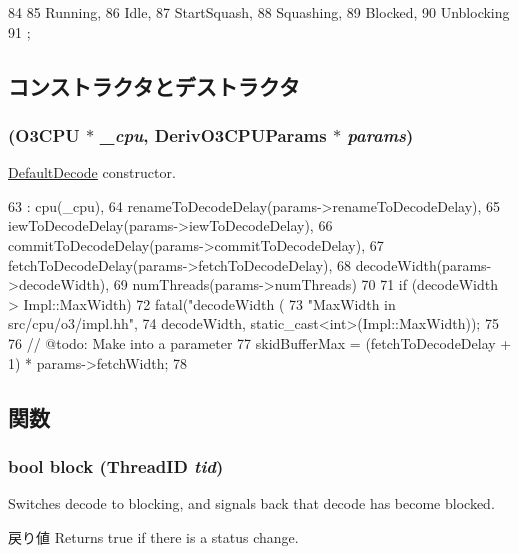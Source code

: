 \begin{DoxyCode}
84                       {
85         Running,
86         Idle,
87         StartSquash,
88         Squashing,
89         Blocked,
90         Unblocking
91     };
\end{DoxyCode}


\subsection{コンストラクタとデストラクタ}
\hypertarget{classDefaultDecode_a23f15d8a826761fea1106a071b97cf79}{
\subsubsection[{DefaultDecode}]{ ({\bf O3CPU} $\ast$ {\em \_\-cpu}, \/  DerivO3CPUParams $\ast$ {\em params})}}
\label{classDefaultDecode_a23f15d8a826761fea1106a071b97cf79}
\hyperlink{classDefaultDecode}{DefaultDecode} constructor. 


\begin{DoxyCode}
63     : cpu(_cpu),
64       renameToDecodeDelay(params->renameToDecodeDelay),
65       iewToDecodeDelay(params->iewToDecodeDelay),
66       commitToDecodeDelay(params->commitToDecodeDelay),
67       fetchToDecodeDelay(params->fetchToDecodeDelay),
68       decodeWidth(params->decodeWidth),
69       numThreads(params->numThreads)
70 {
71     if (decodeWidth > Impl::MaxWidth)
72         fatal("decodeWidth (%
73              "\tincrease MaxWidth in src/cpu/o3/impl.hh\n",
74              decodeWidth, static_cast<int>(Impl::MaxWidth));
75 
76     // @todo: Make into a parameter
77     skidBufferMax = (fetchToDecodeDelay + 1) *  params->fetchWidth;
78 }
\end{DoxyCode}


\subsection{関数}
\hypertarget{classDefaultDecode_ad1993925abd15d3fb59fde2ccfa3d678}{
\subsubsection[{block}]{\setlength{\rightskip}{0pt plus 5cm}bool block ({\bf ThreadID} {\em tid})}}
\label{classDefaultDecode_ad1993925abd15d3fb59fde2ccfa3d678}
Switches decode to blocking, and signals back that decode has become blocked. \begin{DoxyReturn}{戻り値}
Returns true if there is a status change. 
\end{DoxyReturn}




